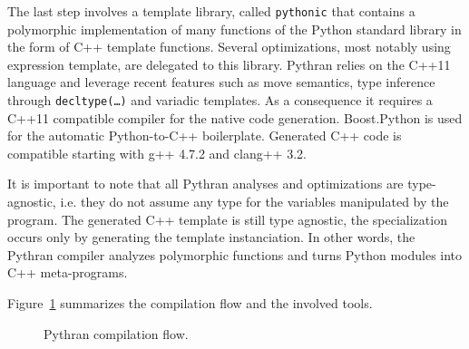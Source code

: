 \documentclass[10pt, onecolumn, preprint]{sigplanconf}
\begin{document}
The last step involves a template library, called \texttt{pythonic} that 
contains a polymorphic implementation of many functions of the Python standard
library in the form of C++ template functions. Several optimizations, most
notably using expression template, are delegated to this library. Pythran relies
on the C++11\cite{isocxx11} language and leverage recent features such as
move semantics, type inference through \texttt{decltype(\dots)} and variadic
templates.
As a consequence it requires a C++11 compatible compiler for the native code
generation. Boost.Python\cite{boostpython2007} is used for the automatic
Python-to-C++ boilerplate. Generated C++ code is compatible starting with g++ 
4.7.2 and clang++ 3.2.

It is important to note that all Pythran analyses and optimizations are
type-agnostic, i.e. they do not assume any type for the variables manipulated
by the program. The generated C++ template is still type agnostic, the specialization occurs only by generating the template instanciation.
In other words, the Pythran compiler analyzes polymorphic functions and turns
Python modules into C++ meta-programs.

Figure~\ref{fig:pythran-compiler} summarizes the compilation flow and the 
involved tools.

\begin{figure}

    \centering
    
    \caption{Pythran compilation flow.}
    \label{fig:pythran-compiler}

\end{figure}
\end{document}
